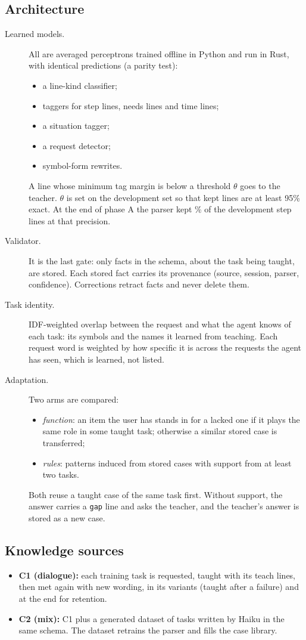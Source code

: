 \subsection{Architecture}
\begin{description}
  \item[Learned models.] All are averaged perceptrons trained offline in Python and run in Rust, with identical predictions (a parity test):
  \begin{itemize}
    \item a line-kind classifier;
    \item taggers for step lines, needs lines and time lines;
    \item a situation tagger;
    \item a request detector;
    \item symbol-form rewrites.
  \end{itemize}
  A line whose minimum tag margin is below a threshold $\theta$ goes to the teacher. $\theta$ is set on the development set so that kept lines are at least 95\% exact. At the end of phase A the parser kept \parserCoverage\% of the \parserDevLines{} development step lines at that precision.
  \item[Validator.] It is the last gate: only facts in the schema, about the task being taught, are stored. Each stored fact carries its provenance (source, session, parser, confidence). Corrections retract facts and never delete them.
  \item[Task identity.] IDF-weighted overlap between the request and what the agent knows of each task: its symbols and the names it learned from teaching. Each request word is weighted by how specific it is across the requests the agent has seen, which is learned, not listed.
  \item[Adaptation.] Two arms are compared:
  \begin{itemize}
    \item \emph{function}: an item the user has stands in for a lacked one if it plays the same role in some taught task; otherwise a similar stored case is transferred;
    \item \emph{rules}: patterns induced from stored cases with support from at least two tasks.
  \end{itemize}
  Both reuse a taught case of the same task first. Without support, the answer carries a \texttt{gap} line and asks the teacher, and the teacher's answer is stored as a new case.
\end{description}

\subsection{Knowledge sources}
\begin{itemize}
  \item \textbf{C1 (dialogue):} each training task is requested, taught with its teach lines, then met again with new wording, in its variants (taught after a failure) and at the end for retention.
  \item \textbf{C2 (mix):} C1 plus a generated dataset of \datasetTasks{} tasks written by Haiku in the same schema. The dataset retrains the parser and fills the case library.
\end{itemize}
